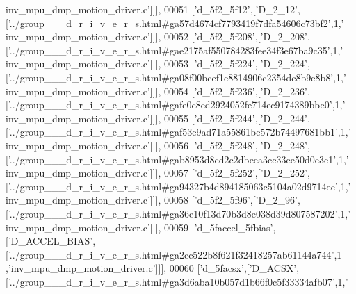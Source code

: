 \begin{DoxyCode}
{      inv\_mpu\_dmp\_motion\_driver.c'}]]],
00051   [\textcolor{stringliteral}{'d\_5f2\_5f12'},[\textcolor{stringliteral}{'D\_2\_12'},[\textcolor{stringliteral}{'../group\_\_\_d\_r\_i\_v\_e\_r\_s.html#ga57d4674cf7793419f7dfa54606c73bf2'},1,\textcolor{stringliteral}{'
      inv\_mpu\_dmp\_motion\_driver.c'}]]],
00052   [\textcolor{stringliteral}{'d\_5f2\_5f208'},[\textcolor{stringliteral}{'D\_2\_208'},[\textcolor{stringliteral}{'../group\_\_\_d\_r\_i\_v\_e\_r\_s.html#gae2175af550784283fee34f3e67ba9c35'},1,\textcolor{stringliteral}{'
      inv\_mpu\_dmp\_motion\_driver.c'}]]],
00053   [\textcolor{stringliteral}{'d\_5f2\_5f224'},[\textcolor{stringliteral}{'D\_2\_224'},[\textcolor{stringliteral}{'../group\_\_\_d\_r\_i\_v\_e\_r\_s.html#ga08f00bcef1e8814906c2354dc8b9e8b8'},1,\textcolor{stringliteral}{'
      inv\_mpu\_dmp\_motion\_driver.c'}]]],
00054   [\textcolor{stringliteral}{'d\_5f2\_5f236'},[\textcolor{stringliteral}{'D\_2\_236'},[\textcolor{stringliteral}{'../group\_\_\_d\_r\_i\_v\_e\_r\_s.html#gafe0c8ed2924052fe714ec9174389bbe0'},1,\textcolor{stringliteral}{'
      inv\_mpu\_dmp\_motion\_driver.c'}]]],
00055   [\textcolor{stringliteral}{'d\_5f2\_5f244'},[\textcolor{stringliteral}{'D\_2\_244'},[\textcolor{stringliteral}{'../group\_\_\_d\_r\_i\_v\_e\_r\_s.html#gaf53e9ad71a55861be572b74497681bb1'},1,\textcolor{stringliteral}{'
      inv\_mpu\_dmp\_motion\_driver.c'}]]],
00056   [\textcolor{stringliteral}{'d\_5f2\_5f248'},[\textcolor{stringliteral}{'D\_2\_248'},[\textcolor{stringliteral}{'../group\_\_\_d\_r\_i\_v\_e\_r\_s.html#gab8953d8cd2c2dbeea3cc33ee50d0e3e1'},1,\textcolor{stringliteral}{'
      inv\_mpu\_dmp\_motion\_driver.c'}]]],
00057   [\textcolor{stringliteral}{'d\_5f2\_5f252'},[\textcolor{stringliteral}{'D\_2\_252'},[\textcolor{stringliteral}{'../group\_\_\_d\_r\_i\_v\_e\_r\_s.html#ga94327b4d894185063c5104a02d9714ee'},1,\textcolor{stringliteral}{'
      inv\_mpu\_dmp\_motion\_driver.c'}]]],
00058   [\textcolor{stringliteral}{'d\_5f2\_5f96'},[\textcolor{stringliteral}{'D\_2\_96'},[\textcolor{stringliteral}{'../group\_\_\_d\_r\_i\_v\_e\_r\_s.html#ga36e10f13d70b3d8e038d39d807587202'},1,\textcolor{stringliteral}{'
      inv\_mpu\_dmp\_motion\_driver.c'}]]],
00059   [\textcolor{stringliteral}{'d\_5faccel\_5fbias'},[\textcolor{stringliteral}{'D\_ACCEL\_BIAS'},[\textcolor{stringliteral}{'../group\_\_\_d\_r\_i\_v\_e\_r\_s.html#ga2cc522b8f621f32418257ab61144a744'},1
      ,\textcolor{stringliteral}{'inv\_mpu\_dmp\_motion\_driver.c'}]]],
00060   [\textcolor{stringliteral}{'d\_5facsx'},[\textcolor{stringliteral}{'D\_ACSX'},[\textcolor{stringliteral}{'../group\_\_\_d\_r\_i\_v\_e\_r\_s.html#ga3d6aba10b057d1b66f0c5f33334afb07'},1,\textcolor{stringliteral}{'
}
\end{DoxyCode}

